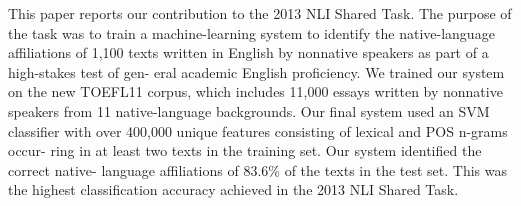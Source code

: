 This paper reports our contribution to the 2013 NLI Shared Task. The purpose of the task was to train a machine-learning system to identify the native-language
 affiliations of 1,100 texts written in English by nonnative speakers as part of
 a high-stakes test of gen- eral academic English proficiency. We trained our
 system on the new TOEFL11 corpus, which includes 11,000 essays written by
 nonnative speakers from 11 native-language backgrounds. Our final system used
 an SVM classifier with over 400,000 unique features consisting of lexical and
 POS n-grams occur- ring in at least two texts in the training set. Our system
 identified the correct native- language affiliations of 83.6\% of the texts in
 the test set. This was the highest classification accuracy achieved in the 2013
 NLI Shared Task.

